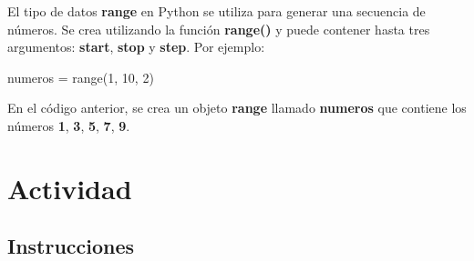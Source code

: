 \documentclass[
  a4paper,
  DIV=11,
  numbers=noendperiod,
  onepage,
  openany]{scrreprt}
\newenvironment{Shaded}{\begin{snugshade}}{\end{snugshade}}
\newcommand{\BuiltInTok}[1]{\textcolor[rgb]{0.00,0.23,0.31}{#1}}
\newcommand{\DecValTok}[1]{\textcolor[rgb]{0.68,0.00,0.00}{#1}}
\newcommand{\NormalTok}[1]{\textcolor[rgb]{0.00,0.23,0.31}{#1}}
\newcommand{\OperatorTok}[1]{\textcolor[rgb]{0.37,0.37,0.37}{#1}}
\begin{document}
El tipo de datos \textbf{range} en Python se utiliza para generar una
secuencia de números. Se crea utilizando la función \textbf{range()} y
puede contener hasta tres argumentos: \textbf{start}, \textbf{stop} y
\textbf{step}. Por ejemplo:

\begin{Shaded}
\begin{Highlighting}[]
\NormalTok{numeros }\OperatorTok{=} \BuiltInTok{range}\NormalTok{(}\DecValTok{1}\NormalTok{, }\DecValTok{10}\NormalTok{, }\DecValTok{2}\NormalTok{)}
\end{Highlighting}
\end{Shaded}

En el código anterior, se crea un objeto \textbf{range} llamado
\textbf{numeros} que contiene los números \textbf{1}, \textbf{3},
\textbf{5}, \textbf{7}, \textbf{9}.

\chapter{Actividad}\label{actividad-1}

\section{Instrucciones}\label{instrucciones-1}
\end{document}

